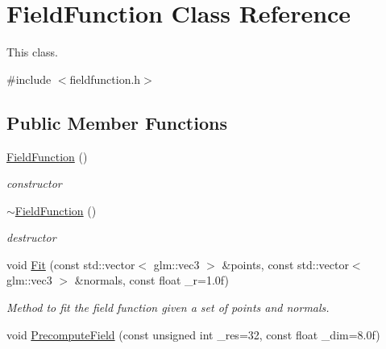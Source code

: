 \hypertarget{classFieldFunction}{}\section{Field\+Function Class Reference}
\label{classFieldFunction}


This class.  




{\ttfamily \#include $<$fieldfunction.\+h$>$}

\subsection*{Public Member Functions}
\begin{DoxyCompactItemize}
\item 
\hyperlink{classFieldFunction_a75fecafa59098d45b5d4898c897ea511}{Field\+Function} ()\hypertarget{classFieldFunction_a75fecafa59098d45b5d4898c897ea511}{}\label{classFieldFunction_a75fecafa59098d45b5d4898c897ea511}

\begin{DoxyCompactList}\small\item\em constructor \end{DoxyCompactList}\item 
\hyperlink{classFieldFunction_a866216b73f8c9d3bfc6288df11d8c40e}{$\sim$\+Field\+Function} ()\hypertarget{classFieldFunction_a866216b73f8c9d3bfc6288df11d8c40e}{}\label{classFieldFunction_a866216b73f8c9d3bfc6288df11d8c40e}

\begin{DoxyCompactList}\small\item\em destructor \end{DoxyCompactList}\item 
void \hyperlink{classFieldFunction_aaf3f6f95b7e94dfa2862b86371e27aed}{Fit} (const std\+::vector$<$ glm\+::vec3 $>$ \&points, const std\+::vector$<$ glm\+::vec3 $>$ \&normals, const float \+\_\+r=1.\+0f)
\begin{DoxyCompactList}\small\item\em Method to fit the field function given a set of points and normals. \end{DoxyCompactList}\item 
void \hyperlink{classFieldFunction_aaa8aa14a1d293a8a97c88099f4c5eba3}{Precompute\+Field} (const unsigned int \+\_\+res=32, const float \+\_\+dim=8.\+0f)\hypertarget{classFieldFunction_aaa8aa14a1d293a8a97c88099f4c5eba3}{}\label{classFieldFunction_aaa8aa14a1d293a8a97c88099f4c5eba3}


\end{DoxyCompactItemize}
